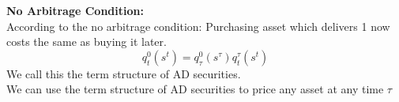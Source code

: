 \documentclass[11pt]{report}
\newcommand{\bb}{\bigbreak\noindent}
\begin{document}
\begin{spacing}{1.5}
		\bb
		\textbf{No Arbitrage Condition:}\\
		According to the no arbitrage condition: Purchasing asset which delivers 1 now costs the same as buying it later.
		\[ q^0_t(s^t) = q^0_\tau(s^\tau)q^\tau_t(s^t) \]
		We call this the term structure of AD securities.\\
		We can use the term structure of AD securities to price any asset at any time $\tau$
		
		
	\end{spacing}
\end{document}
